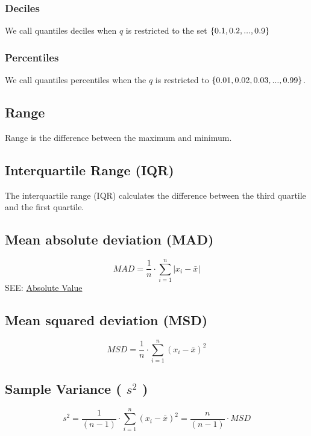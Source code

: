 \subsubsection{Deciles \cite{ism-1}}\label{Deciles}
We call quantiles deciles when $q$ is restricted to the set $\left\{0.1, 0.2, ... , 0.9\right\}$

\subsubsection{Percentiles \cite{ism-1}}\label{Percentiles}
We call quantiles percentiles when the $q$ is restricted to $\left\{0.01, 0.02, 0.03, ... , 0.99\right\}$.

\subsection{Range \cite{ism-1}}\label{Range}
Range is the difference between the maximum and minimum.

\subsection{Interquartile Range (IQR) \cite{ism-1}}\label{Interquartile Range (IQR)}
The interquartile range (IQR) calculates the difference between the third quartile and the first quartile.

\subsection{Mean absolute deviation (MAD) \cite{ism-1}}\label{Mean absolute deviation}
\[
    MAD = \displaystyle\dfrac{1}{n} \cdot \sum_{i=1}^{n} \left| x_i - \bar{x} \right|
\]
SEE: \hyperref[abs_value]{Absolute Value}


\subsection{Mean squared deviation (MSD) \cite{ism-1}} \label{Mean squared deviation}
\[
    MSD = \displaystyle\dfrac{1}{n} \cdot \sum_{i=1}^{n} ( x_i - \bar{x} )^2
\]


\subsection{Sample Variance ( $s^2$ ) \cite{ism-1}}\label{Sample Variance}
\[
    s^2 = \displaystyle\dfrac{1}{(n-1)} \cdot \sum_{i=1}^{n} ( x_i - \bar{x} )^2 = \displaystyle\dfrac{n}{(n-1)} \cdot MSD
\]

